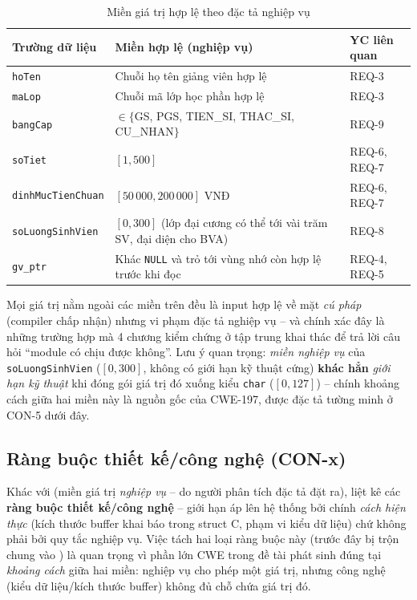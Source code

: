 \begin{table}[H]
  \centering
  \caption{Miền giá trị hợp lệ theo đặc tả nghiệp vụ}
  \label{tab:range}
  \footnotesize
  \begin{tabularx}{\linewidth}{@{}l X l@{}}
    \toprule
    \textbf{Trường dữ liệu} & \textbf{Miền hợp lệ (nghiệp vụ)} & \textbf{YC liên quan} \\
    \midrule
    \texttt{hoTen}            & Chuỗi họ tên giảng viên hợp lệ                & REQ-3 \\
    \texttt{maLop}             & Chuỗi mã lớp học phần hợp lệ                   & REQ-3 \\
    \texttt{bangCap}          & $\in \{$GS, PGS, TIEN\_SI, THAC\_SI, CU\_NHAN$\}$ & REQ-9 \\
    \texttt{soTiet}            & $[1, 500]$                                  & REQ-6, REQ-7 \\
    \texttt{dinhMucTienChuan} & $[50\,000, 200\,000]$ VNĐ                   & REQ-6, REQ-7 \\
    \texttt{soLuongSinhVien}  & $[0, 300]$ (lớp đại cương có thể tới vài trăm SV, đại diện cho BVA) & REQ-8 \\
    \texttt{gv\_ptr}           & Khác \texttt{NULL} và trỏ tới vùng nhớ còn hợp lệ trước khi đọc & REQ-4, REQ-5 \\
    \bottomrule
  \end{tabularx}
\end{table}

Mọi giá trị nằm ngoài các miền trên đều là input hợp lệ về mặt \emph{cú pháp} (compiler chấp nhận) nhưng vi phạm đặc tả nghiệp vụ -- và chính xác đây là những trường hợp mà 4 chương kiểm chứng ở  tập trung khai thác để trả lời câu hỏi ``module có chịu được không''. Lưu ý quan trọng: \emph{miền nghiệp vụ} của \texttt{soLuongSinhVien} ($[0,300]$, không có giới hạn kỹ thuật cứng) \textbf{khác hẳn} \emph{giới hạn kỹ thuật} khi đóng gói giá trị đó xuống kiểu \texttt{char} ($[0,127]$) -- chính khoảng cách giữa hai miền này là nguồn gốc của CWE-197, được đặc tả tường minh ở CON-5 dưới đây.

\subsection{Ràng buộc thiết kế/công nghệ (CON-x)}
\label{sec:constraints}

Khác với  (miền giá trị \emph{nghiệp vụ} -- do người phân tích đặc tả đặt ra),  liệt kê các \textbf{ràng buộc thiết kế/công nghệ} -- giới hạn áp lên hệ thống bởi chính \emph{cách hiện thực} (kích thước buffer khai báo trong struct C, phạm vi kiểu dữ liệu) chứ không phải bởi quy tắc nghiệp vụ. Việc tách hai loại ràng buộc này (trước đây bị trộn chung vào ) là quan trọng vì phần lớn CWE trong đề tài phát sinh đúng tại \emph{khoảng cách} giữa hai miền: nghiệp vụ cho phép một giá trị, nhưng công nghệ (kiểu dữ liệu/kích thước buffer) không đủ chỗ chứa giá trị đó.


